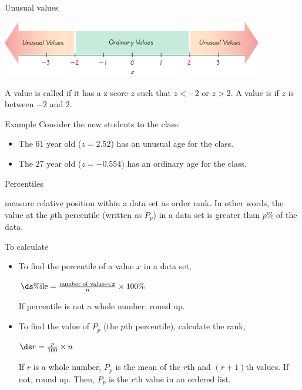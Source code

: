 \documentclass[xcolor=table, handout]{beamer}
\begin{document}
\begin{frame}{Unusual values}

{\centering
\includegraphics[width=4.5in]{../images/ch03_unusual} \par
}

\begin{block}{}
\large
A value is called  if it has a z-score $z$ such that $z< -2$ or $z > 2$. A value is  if $z$ is between $-2$ and $2$.
\end{block}

\pause
\begin{exampleblock}{Example}
Consider the new students to the class:
\begin{itemize}
\item The 61 year old ($z=2.52$) has an unusual age for the class. 
\item The 27 year old ($z=-0.554$) has an ordinary age for the class.
\end{itemize}
\end{exampleblock}
\end{frame}

\begin{frame}{Percentiles}
\begin{block}{}
\large
{} measure relative position within a data set as order rank. In other words, the value at the $p$th percentile (written as $P_p$) in a data set is greater than $p$\% of the data.
\end{block}

\pause
\begin{block}{To calculate}
\begin{itemize}
\item To find the percentile of a value $x$ in a data set,\\
\smallskip
{\centering
$\ds \%\text{ile} = \frac{\text{number of values} < x}{n} \times 100\%$
\par}
\medskip
If percentile is not a whole number, round up.
\medskip
\pause\item To find the value of $P_p$ (the $p$th percentile), calculate the rank,\\
\smallskip
{\centering
$\ds r = \frac p {100} \times n$
\par}
\medskip
If $r$ is a whole number, $P_p$ is the mean of the $r$th and $(r+1)$th values. If not, round up. Then, $P_p$ is the $r$th value in an ordered list.
\end{itemize}
\end{block}
\end{frame}
\end{document}
